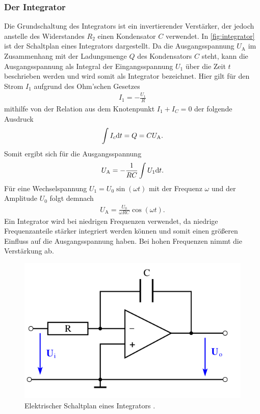 \subsubsection{Der Integrator}\label{subsubsec:Integrator}              %

Die Grundschaltung des Integrators ist ein invertierender Verstärker, der jedoch anstelle des Widerstandes $R_2$ einen Kondensator $C$ verwendet.
In \autoref{fig:integrator} ist der Schaltplan eines Integrators dargestellt.
Da die Ausgangsspannung $U_\text{A}$ im Zusammenhang mit der Ladungsmenge $Q$ des Kondensators $C$ steht, kann die Ausgangsspannung als Integral der Eingangsspannung $U_1$ über die Zeit $t$ beschrieben werden und wird somit als Integrator bezeichnet.
Hier gilt für den Strom $I_1$ aufgrund des Ohm'schen Gesetzes
\begin{align}
    \label{eq:OhmschesGesetz}
    I_1=-\frac{U_1}{R}
\end{align}
mithilfe von der Relation aus dem Knotenpunkt $I_1+I_C=0$ der folgende Ausdruck
\begin{align}
    \label{eq:StromKondensator}
    \int I_c\text dt=Q=CU_\text{A}.
\end{align}
Somit ergibt sich für die Ausgangsspannung
\begin{align}
    \label{eq:AusgangsspannungIntegrator}
    U_\text{A}=-\frac1{RC}\int U_1\text dt.
\end{align}
Für eine Wechselspannung $U_1=U_0\sin(\omega t)$ mit der Frequenz $\omega$ und der Amplitude $U_0$  folgt demnach
\begin{align}
    \label{eq:AusgangsspannungIntegratorWechselspannung}
    U_\text{A}=\frac{U_0}{\omega RC}\cos(\omega t).
\end{align}
Ein Integrator wird bei niedrigen Frequenzen verwendet, da niedrige Frequenzanteile stärker integriert werden können und somit einen größeren Einfluss auf die Ausgangsspannung haben.
Bei hohen Frequenzen nimmt die Verstärkung ab.
\begin{figure}[H]
	\centering
    \includegraphics[width=0.6\linewidth]{figures/Integrator.png}
	\caption{Elektrischer Schaltplan eines Integrators \cite{Anleitung51}.}
	\label{fig:integrator}
\end{figure}



